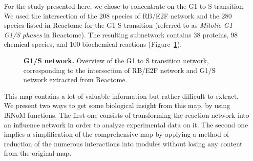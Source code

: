 \documentclass[10pt]{bmc_article}
\newenvironment{bmcformat}{\baselineskip20pt\sloppy\setboolean{publ}{false}}{\baselineskip20pt\sloppy}
\begin{document}
\begin{bmcformat}
For the study presented here, we chose to concentrate on the G1 to S transition. We
used the intersection of the 208 species
of RB/E2F network and the 280 species listed in Reactome \cite{joshi2005reactome} for the G1-S transition
(referred to as \emph{Mitotic G1 G1/S phases} in Reactome). The resulting
subnetwork contains 38 proteins, 98 chemical species, and 100 biochemical
reactions (Figure~\ref{g1s}).

\begin{figure}[h]
 \caption{\label{g1s}  \textbf{G1/S network.}
	Overview of the G1 to S transition network, corresponding to the intersection of
RB/E2F network and G1/S network extracted from Reactome.}
\end{figure}

This map contains a lot of valuable information but rather difficult to extract. We present two
ways to get some biological insight from this map, by using BiNoM functions. The first one consists of
transforming the reaction network into an influence network in order to analyze
experimental data on it. The second one implies a simplification of the comprehensive map by
applying a method of reduction of the numerous interactions into modules without
losing any content from the original map.


\end{bmcformat}
\end{document}
